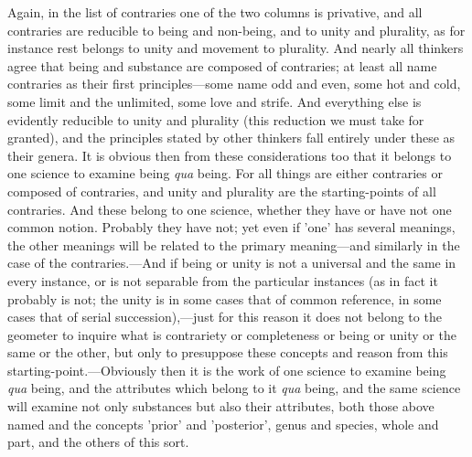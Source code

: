 Again, in the list of contraries one of the two columns is privative, and all contraries are reducible to being and non-being, and to unity and plurality, as for instance rest belongs to unity and movement to plurality. And nearly all thinkers agree that being and substance are composed of contraries; at least all name contraries as their first principles—some name odd and even, some hot and cold, some limit and the unlimited, some love and strife. And everything else is evidently reducible to unity and plurality (this reduction we must take for granted), and the principles stated by other thinkers fall entirely under these as their genera. It is obvious then from these considerations too that it belongs to one science to examine being \emph{qua} being. For all things are either contraries or composed of contraries, and unity and plurality are the starting-points of all contraries. And these belong to one science, whether they have or have not one common notion. Probably they have not; yet even if 'one' has several meanings, the other meanings will be related to the primary meaning—and similarly in the case of the contraries.—And if being or unity is not a universal and the same in every instance, or is not separable from the particular instances (as in fact it probably is not; the unity is in some cases that of common reference, in some cases that of serial succession),—just for this reason it does not belong to the geometer to inquire what is contrariety or completeness or being or unity or the same or the other, but only to presuppose these concepts and reason from this starting-point.—Obviously then it is the work of one science to examine being \emph{qua} being, and the attributes which belong to it \emph{qua} being, and the same science will examine not only substances but also their attributes, both those above named and the concepts 'prior' and 'posterior', genus and species, whole and part, and the others of this sort.


